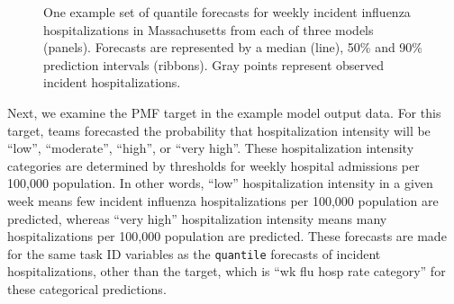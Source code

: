 \documentclass[
  article,
  shortnames,
  notitle]{jss}
\begin{document}
\begin{figure}[H]


\caption{\label{fig-plot-ex-mods}One example set of quantile forecasts
for weekly incident influenza hospitalizations in Massachusetts from
each of three models (panels). Forecasts are represented by a median
(line), 50\% and 90\% prediction intervals (ribbons). Gray points
represent observed incident hospitalizations.}

\end{figure}%

Next, we examine the PMF target in the example model output data. For
this target, teams forecasted the probability that hospitalization
intensity will be ``low'', ``moderate'', ``high'', or ``very high''.
These hospitalization intensity categories are determined by thresholds
for weekly hospital admissions per 100,000 population. In other words,
``low'' hospitalization intensity in a given week means few incident
influenza hospitalizations per 100,000 population are predicted, whereas
``very high'' hospitalization intensity means many hospitalizations per
100,000 population are predicted. These forecasts are made for the same
task ID variables as the \texttt{quantile} forecasts of incident
hospitalizations, other than the target, which is ``wk flu hosp rate
category'' for these categorical predictions.
\end{document}

